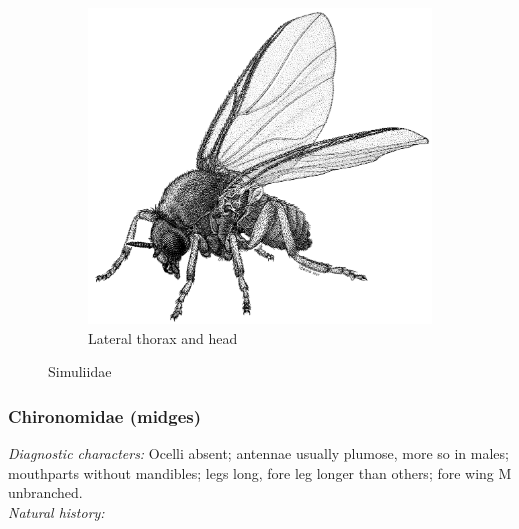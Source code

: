 \documentclass[letterpaper, 11pt]{article}
\begin{document}
\begin{figure}[ht!]
\begin{subfigure}[ht!]{0.42\textwidth}
        \includegraphics[width=\textwidth]{SimuliidHabitus}
        \caption{Lateral thorax and head \citep[][Fig. 27.1]{mcalpine1981manual}}
        \label{fig:simuliid2}
    \end{subfigure}
    \caption{Simuliidae}\label{fig:simuliids}
\end{figure}

\subsubsection{Chironomidae (midges)}
\noindent{}\textit{Diagnostic characters:} Ocelli absent; antennae usually plumose, more so in males; mouthparts without mandibles; legs long, fore leg longer than others; fore wing M unbranched.\\

\noindent{}\textit{Natural history:} \\
\end{document}
